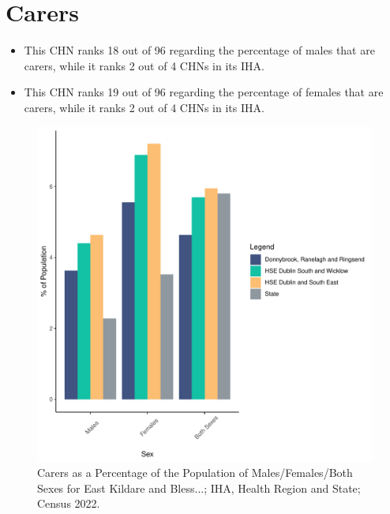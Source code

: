 \documentclass{article}
\begin{document}
\section{Carers}\label{sect:Carers}
\begin{itemize}
\item This CHN ranks  18 out of 96 regarding the percentage of males that are carers, while it ranks   2 out of 4 CHNs in its IHA.
\item This CHN ranks  19 out of 96 regarding the percentage of females that are carers, while it ranks   2 out of 4 CHNs in its IHA.
\end{itemize}
\begin{figure}[H]
	\centering
	\includegraphics[width = 150mm]{../figures/CareED.pdf}
	\caption{Carers as a Percentage of the Population of Males/Females/Both Sexes for East Kildare and Bless...; IHA, Health Region and State; Census 2022.}
	\label{fig:2ae19629-1a6a-13a3-e055-000000000001}
	\end{figure}
\end{document}
